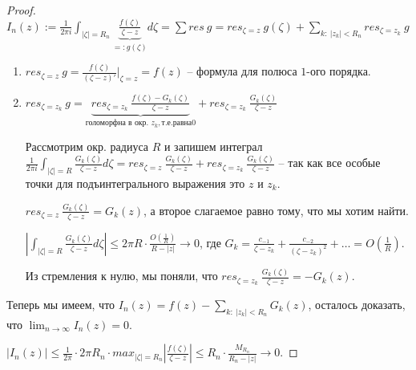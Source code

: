 \begin{proof}
    $I_n(z) := \frac{1}{2\pi i}\int_{|\zeta| = R_n} {\underbrace{\frac{f(\zeta)}{\zeta - z}}_{=: g(\zeta)} d\zeta} = \sum res \ g = res_{\zeta = z} \ g(\zeta) + \sum_{k : \ |z_k| < R_n} res_{\zeta = z_k} \ g$

    \begin{enumerate}
        \item {
            $res_{\zeta = z} \ g = \frac{f(\zeta)}{(\zeta - z)'}|_{\zeta = z} = f(z)$ -- формула для полюса $1$-ого порядка.
        }
        \item {
            $res_{\zeta = z_k} \ g = \underbrace{res_{\zeta = z_k} \ \frac{f(\zeta) - G_k(\zeta)}{\zeta - z}}_{\text{голоморфна в окр. } z_k, т.е. равна 0} + res_{\zeta = z_k} \ \frac{G_k(\zeta)}{\zeta - z}$

            Рассмотрим окр. радиуса $R$ и запишем интеграл $\frac{1}{2 \pi i} \int_{|\zeta| = R} {\frac{G_k(\zeta)}{\zeta - z} d\zeta} = res_{\zeta = z} \ \frac{G_k(\zeta)}{\zeta - z} + res_{\zeta = z_k} \ \frac{G_k(\zeta)}{\zeta - z}$ -- так как все особые точки для подъинтегрального выражения это $z$ и $z_k$.


            $res_{\zeta = z} \ \frac{G_k(\zeta)}{\zeta - z} = G_k(z)$, а второе слагаемое равно тому, что мы хотим найти.

            $\left| \int_{|\zeta| = R} {\frac{G_k(\zeta)}{\zeta - z} d\zeta} \right| \leq 2\pi R \cdot \frac{O\left(\frac{1}{R}\right)}{R - |z|} \rightarrow 0$, где $G_k = \frac{c_{-1}}{\zeta - z_k} + \frac{c_{-2}}{(\zeta - z_k)^2} + \ldots = O(\frac{1}{R})$.

            Из стремления к нулю, мы поняли, что $res_{\zeta = z_k} \ \frac{G_k(\zeta)}{\zeta - z} = -G_k(z)$.
        }
    \end{enumerate}


    Теперь мы имеем, что $I_n(z) = f(z) - \sum_{k: \ |z_k| < R_n} G_k(z)$, осталось доказать, что $\lim_{n \rightarrow \infty} I_n(z) = 0$.

    $\left| I_n(z) \right| \leq \frac{1}{2 \pi} \cdot 2\pi R_n \cdot max_{|\zeta| = R_n} \left| \frac{f(\zeta)}{\zeta - z} \right| \leq R_n \cdot \frac{M_{R_n}}{R_n - |z|} \rightarrow 0$.




\end{proof}
